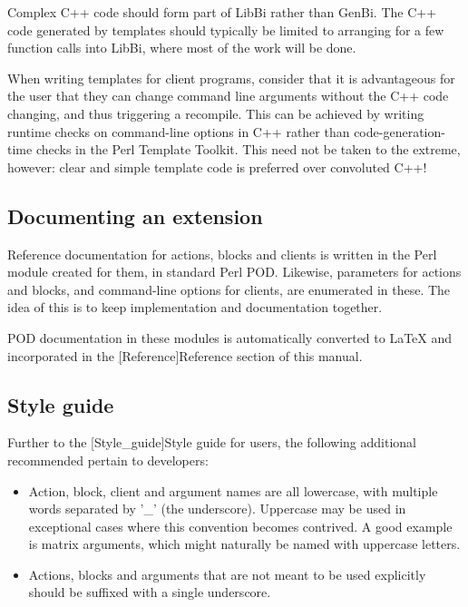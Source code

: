 Complex C++ code should form part of LibBi rather than GenBi. The C++ code
generated by templates should typically be limited to arranging for a few
function calls into LibBi, where most of the work will be done.

When writing templates for client programs, consider that it is advantageous
for the user that they can change command line arguments without the C++ code
changing, and thus triggering a recompile. This can be achieved by writing
runtime checks on command-line options in C++ rather than code-generation-time
checks in the Perl Template Toolkit. This need not be taken to the extreme,
however: clear and simple template code is preferred over convoluted C++!

\subsection{Documenting an extension\label{Documenting_an_extension}}

Reference documentation for actions, blocks and clients is written in the Perl
module created for them, in standard Perl POD. Likewise, parameters for
actions and blocks, and command-line options for clients, are enumerated in
these. The idea of this is to keep implementation and documentation together.

POD documentation in these modules is automatically converted to LaTeX and
incorporated in the \hyperref[hyper][Reference]{Reference} section of this
manual.

\subsection{Style guide\label{Developer_style_guide}}

Further to the \hyperref[hyper][Style_guide]{Style guide} for users, the
following additional recommended pertain to developers:
\begin{itemize}
\item Action, block, client and argument names are all lowercase, with
  multiple words separated by '\_' (the underscore). Uppercase may be used in
  exceptional cases where this convention becomes contrived. A good example is
  matrix arguments, which might naturally be named with uppercase letters.
\item Actions, blocks and arguments that are not meant to be used explicitly
  should be suffixed with a single underscore.
\end{itemize}

